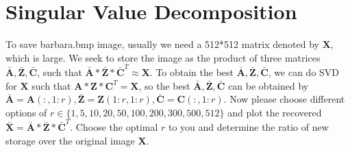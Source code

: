 \documentclass[11pt]{article}
\newcommand{\R}{\mathbb{R}}
\newcommand{\mtx}[1]{\mathbf{#1}}
\newcommand{\vct}[1]{\mathbf{#1}}
\def \mA {\mtx{A}}
\def \mC {\mtx{C}}
\def \mX {\mtx{X}}
\def \mZ {\mtx{Z}}
\def \vx {\vct{x}}
\def \vy {\vct{y}}
\def \R {\mathbb{R}}
\begin{document}
\section*{Singular Value Decomposition}
To save barbara.bmp image, usually we need a 512*512 matrix denoted by $\mX$, which is large. We seek to store the image as the product of three matrices $\bar{\mA},\bar{\mZ},\bar{\mC}$, such that $\bar{\mA}*\bar{\mZ}*\bar{\mC}^T\approx\mX$. To obtain the best $\bar{\mA},\bar{\mZ},\bar{\mC}$, we can do SVD for $\mX$ such that $\mA*\mZ*\mC^T=\mX$, so the best $\bar{\mA},\bar{\mZ},\bar{\mC}$ can be obtained by $\bar{\mA}=\mA(:,1:r),\bar{\mZ}=\mZ(1:r,1:r),\bar{\mC}=\mC(:,1:r)$. Now please choose different options of $r\in\{1,5,10,20,50,100,200,300,500,512\}$ and plot the recovered $\bar{\mX}=\bar{\mA}*\bar{\mZ}*\bar{\mC}^T$. Choose the optimal $r$ to you and determine the ratio of new storage over the original image $\mX$.
\end{document}
